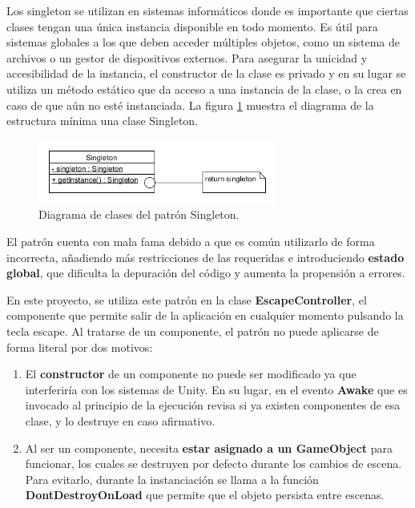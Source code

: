 Los singleton se utilizan en sistemas informáticos donde es importante que ciertas clases tengan una única instancia disponible en todo momento. Es útil para sistemas globales a los que deben acceder múltiples objetos, como un sistema de archivos o un gestor de dispositivos externos. Para asegurar la unicidad y accesibilidad de la instancia, el constructor de la clase es privado y en su lugar se utiliza un método estático que da acceso a una instancia de la clase, o la crea en caso de que aún no esté instanciada. La figura \ref{singleton_diagram} muestra el diagrama de la estructura mínima una clase Singleton.
\begin{figure}[h]
	\includegraphics[width=0.7\textwidth]{images/estructura/patrones/singleton}
	\centering
	\caption{Diagrama de clases del patrón Singleton.}
	\label{singleton_diagram}
\end{figure}

El patrón cuenta con mala fama debido a que es común utilizarlo de forma incorrecta, añadiendo más restricciones de las requeridas e introduciendo \textbf{estado global}, que dificulta la depuración del código y aumenta la propensión a errores.

En este proyecto, se utiliza este patrón en la clase \textbf{EscapeController}, el componente que permite salir de la aplicación en cualquier momento pulsando la tecla escape. Al tratarse de un componente, el patrón no puede aplicarse de forma literal por dos motivos:
\begin{enumerate}
\item El \textbf{constructor} de un componente no puede ser modificado ya que interferiría con los sistemas de Unity. En su lugar, en el evento \textbf{Awake} que es invocado al principio de la ejecución revisa si ya existen componentes de esa clase, y lo destruye en caso afirmativo.
\item Al ser un componente, necesita \textbf{estar asignado a un GameObject} para funcionar, los cuales se destruyen por defecto durante los cambios de escena. Para evitarlo, durante la instanciación se llama a la función \textbf{DontDestroyOnLoad} que permite que el objeto persista entre escenas.
\end{enumerate}
